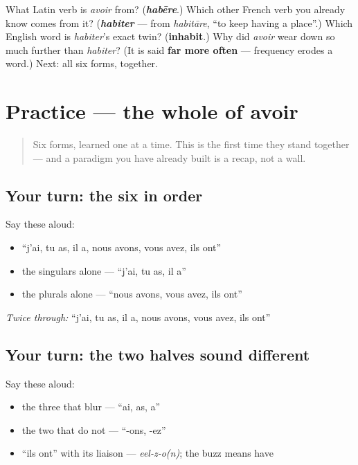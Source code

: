 \begin{tcolorbox}[breakable,colback=teal!4,colframe=teal!35!black,title={Before you move on}]
What Latin verb is \emph{avoir} from? (\emph{\textbf{habēre}}.) Which other French verb you already know comes from it? (\emph{\textbf{habiter}} — from \emph{habitāre}, \textquotedblleft{}to keep having a place\textquotedblright{}.) Which English word is \emph{habiter}'s exact twin? (\textbf{inhabit}.) Why did \emph{avoir} wear down so much further than \emph{habiter}? (It is said \textbf{far more often} — frequency erodes a word.) Next: all six forms, together.
\end{tcolorbox}
\section[Practice]{Practice — the whole of avoir}

\label{lesson:FR-C14-practice-avoir}



\begin{quote}
Six forms, learned one at a time. This is the first time they stand together — and a paradigm you have already built is a recap, not a wall.
\end{quote}

\subsection*{Your turn: the six in order}
Say these aloud:

\begin{itemize}
\raggedright
  \item \textquotedblleft{}j'ai, tu as, il a, nous avons, vous avez, ils ont\textquotedblright{}
  \item the singulars alone — \textquotedblleft{}j'ai, tu as, il a\textquotedblright{}
  \item the plurals alone — \textquotedblleft{}nous avons, vous avez, ils ont\textquotedblright{}
\end{itemize}

\emph{Twice through:} \textquotedblleft{}j'ai, tu as, il a, nous avons, vous avez, ils ont\textquotedblright{}

\subsection*{Your turn: the two halves sound different}
Say these aloud:

\begin{itemize}
\raggedright
  \item the three that blur — \textquotedblleft{}ai, as, a\textquotedblright{}
  \item the two that do not — \textquotedblleft{}-ons, -ez\textquotedblright{}
  \item \textquotedblleft{}ils ont\textquotedblright{} with its liaison — \emph{eel-z-o(n)}; the buzz means have
\end{itemize}

